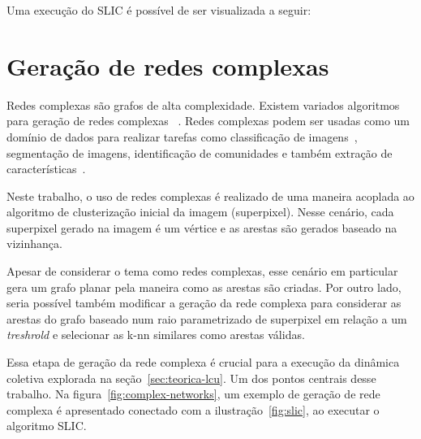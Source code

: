Uma execução do SLIC é possível de ser visualizada a seguir:

\begin{figure}[h!]
        \captionsetup{width=12cm}
		\centering
\end{figure}


\section{Geração de redes complexas}\label{sec:teorica-redes-complexas}

Redes complexas são grafos de alta complexidade. Existem variados
algoritmos para geração de redes complexas
~\cite{ComplexNetworksSurvey2007}. Redes complexas podem ser usadas
como um domínio de dados para realizar tarefas como classificação de
imagens~\cite{ComplexNetworksImageClassification2015}, segmentação de
imagens, identificação de comunidades e também extração de
características~\cite{JarbasComplexNetworks2020}.

Neste trabalho, o uso de redes complexas é realizado de uma maneira
acoplada ao algoritmo de clusterização inicial da imagem (superpixel). Nesse
cenário, cada superpixel gerado na imagem é um vértice e as arestas
são gerados baseado na vizinhança.

Apesar de considerar o tema como redes complexas, esse cenário em
particular gera um grafo planar pela maneira como as arestas são
criadas. Por outro lado, seria possível também modificar a geração da
rede complexa para considerar as arestas do grafo baseado num raio
parametrizado de superpixel em relação a um \textit{treshrold} e
selecionar as k-nn similares como arestas válidas.

Essa etapa de geração da rede complexa é crucial para a execução da
dinâmica coletiva explorada na seção~\ref{sec:teorica-lcu}. Um dos
pontos centrais desse trabalho. Na figura~\ref{fig:complex-networks},
um exemplo de geração de rede complexa é apresentado conectado com a
ilustração~\ref{fig:slic}, ao executar o algoritmo SLIC.\@

